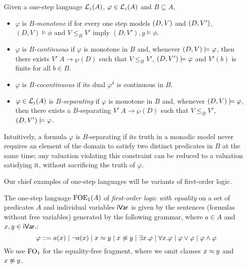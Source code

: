 \begin{definition}\label{def:semnotions} Given a one-step language $\mathcal{L}_{\scriptscriptstyle 1}(A)$, $\varphi \in \mathcal{L}_{\scriptscriptstyle 1}(A)$ and $B \subseteq A$,
\begin{itemize}
\item $\varphi$ is \emph{$B$-monotone} if for every one step models $(D,V)$ and $(D,V')$, $(D,V) \models \phi$ and $V \leq_{B} V'$ imply $(D,V'),g \models \phi$.
\item $\varphi$ is \emph{$B$-continuous} if $\varphi$ is monotone in $B$ and, whenever $(D,V) \models \varphi$, then there exists $V' \: A \to \wp(D)$ such that $V \leq_{B} V'$, $(D,V') \models \varphi$ and $V'(b)$ is finite for all $b \in B$.
\item $\varphi$ is \emph{$B$-cocontinuous} if its dual $\varphi^{\delta}$ is continuous in $B$.
\item $\varphi \in \mathcal{L}_{\scriptscriptstyle 1}(A)$ is \emph{$B$-separating} if $\varphi$ is monotone in $B$ and, whenever $(D,V) \models \varphi$, then there exists a $B$-separating $V' \: A \to \wp(D)$ such that $V \leq_{B} V'$, $(D,V') \models \varphi$. %
\end{itemize}
\end{definition}

Intuitively, a formula $\varphi$ is $B$-separating if its truth in a monadic model never requires an element of the domain to satisfy two distinct predicates in $B$ at the same time; any valuation violating this constraint can be reduced to a valuation satisfying it, without sacrificing the truth of $\varphi$.


Our chief examples of one-step languages will be variants of first-order logic.

\begin{definition}
The one-step language $\mathrm{FOE}_1(A)$ of \emph{first-order logic with equality} on a set of predicates $A$ and individual variables $\mathsf{iVar}$ is given by the sentences (formulas without free variables) generated by the following grammar, where $a \in A$ and $x,y\in\mathsf{iVar}$.:
\begin{equation}\label{eq:grammarofoe}
\varphi ::= a(x) \mid \lnot a(x) \mid x \foeq y \mid x \not\foeq y \mid \exists x.\varphi \mid \forall x.\varphi \mid \varphi \lor \varphi \mid \varphi \land \varphi
\end{equation}
We use $\mathrm{FO}_1$ for the equality-free fragment, where we omit clauses $x \approx y$ and $x \not\approx y$.
\end{definition}

